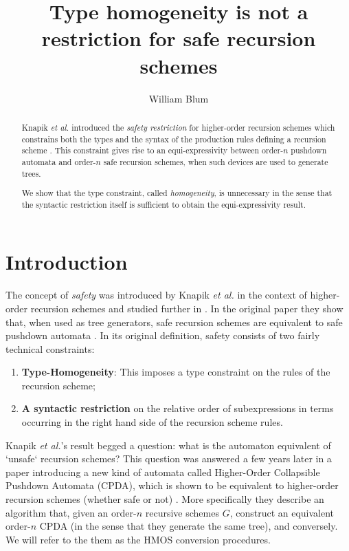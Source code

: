 \documentclass[a4paper,draft]{article}[12pt]
\author{William Blum}
\title{Type homogeneity is not a restriction for safe recursion schemes}
\theoremstyle{remark}
\theoremstyle{definition}
\begin{document}
\maketitle
\begin{abstract}

Knapik \emph{et al.} introduced the \emph{safety restriction} for higher-order recursion schemes which constrains both the types and the syntax of the production rules defining a recursion scheme \cite{KNU02}. This constraint gives rise to an equi-expressivity between 
order-$n$ pushdown automata and order-$n$ safe recursion schemes, when such devices are used to generate trees.

We show that the type constraint, called \emph{homogeneity}, is unnecessary in the sense that the syntactic restriction itself is sufficient to obtain the
equi-expressivity result.
\end{abstract}

\section{Introduction}
The concept of \emph{safety} was introduced by Knapik \emph{et al.} in the
context of higher-order recursion schemes and studied further in \cite{KNU02,
demirandathesis}. In the original paper they show that, when used as tree
generators, safe recursion schemes are equivalent to safe pushdown automata
\cite{KNU02}. 
In its original definition, safety consists of two fairly technical constraints:
\begin{enumerate}
\item \textbf{Type-Homogeneity}: This imposes a type constraint on the rules of
the recursion scheme;
\item \textbf{A syntactic restriction} on the relative order of subexpressions
in terms occurring in the right hand side of the recursion scheme rules.
\end{enumerate}

Knapik \emph{et al.}'s result begged a question: what is the automaton
equivalent of `unsafe` recursion schemes?
This question was answered a few years later in a paper introducing a new kind
of automata called Higher-Order Collapsible Pushdown Automata (CPDA), which is
shown to be equivalent to higher-order recursion schemes (whether safe or not)
\cite{hmos-lics08}. More specifically they describe an algorithm that, given an
order-$n$ recursive schemes $G$, construct an equivalent order-$n$ CPDA (in the
sense that they generate the same tree), and conversely. We will refer to the
them as the HMOS conversion procedures.
\end{document}
